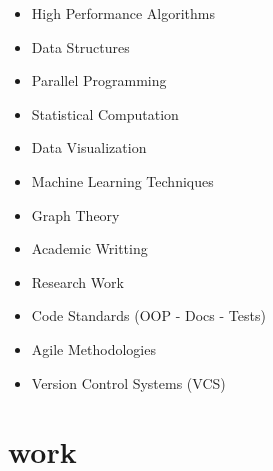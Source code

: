 \documentclass{friggeri-cv}
\newcommand{\myhref}[2]{\href[pdfnewwindow=true]{#1}{#2}}
\newcommand{\Brooktec}{\myhref{https://brooktec.com/}{Brooktec}}
\begin{document}
    \noindent
    \begin{minipage}[t]{0.5\linewidth}
      \begin{itemize}
      	\item{High Performance Algorithms}
  	    \item{Data Structures}
        \item{Parallel Programming}
        \item{Statistical Computation}
        \item{Data Visualization}
        \item{Machine Learning Techniques}
      \end{itemize}
    \end{minipage}%
    \begin{minipage}[t]{0.5\linewidth}
      \begin{itemize}
        \item{Graph Theory}
      	\item{Academic Writting}
        \item{Research Work}
        \item{Code Standards (OOP - Docs - Tests)}
        \item{Agile Methodologies}
        \item{Version Control Systems (VCS)}
      \end{itemize}
    \end{minipage}
    \par\bigskip




  \section{work}



\end{document}
